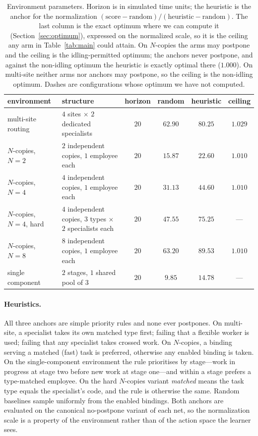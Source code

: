 \documentclass[review,authoryear,3p,times]{elsarticle}
\begin{document}
\begin{table}[tbp]
\centering
\caption{Environment parameters. Horizon is in simulated time units; the
heuristic is the anchor for the normalization
$(\text{score}-\text{random})/(\text{heuristic}-\text{random})$. The last
column is the exact optimum where we can compute it
(Section~\ref{sec:optimum}), expressed on the normalized scale, so it is the
ceiling any arm in Table~\ref{tab:main} could attain. On $N$-copies the arms
may postpone and the ceiling is the idling-permitted optimum; the anchors never
postpone, and against the non-idling optimum the heuristic is exactly optimal
there ($1.000$). On multi-site neither arms nor anchors may postpone, so the
ceiling is the non-idling optimum. Dashes are configurations whose optimum we
have not computed.}
\label{tab:envspec}
\small
\begin{tabular}{llcccc}
\toprule
environment & structure & horizon & random & heuristic & ceiling \\
\midrule
multi-site routing & $4$ sites $\times$ $2$ dedicated specialists & $20$ & $62.90$ & $80.25$ & $1.029$ \\
$N$-copies, $N=2$  & $2$ independent copies, $1$ employee each & $20$ & $15.87$ & $22.60$ & $1.010$ \\
$N$-copies, $N=4$  & $4$ independent copies, $1$ employee each & $20$ & $31.13$ & $44.60$ & $1.010$ \\
$N$-copies, $N=4$, hard & $4$ independent copies, $3$ types $\times$ $2$ specialists each & $20$ & $47.55$ & $75.25$ & --- \\
$N$-copies, $N=8$  & $8$ independent copies, $1$ employee each & $20$ & $63.20$ & $89.53$ & $1.010$ \\
single component   & $2$ stages, $1$ shared pool of $3$ & $20$ & $9.85$ & $14.78$ & --- \\
\bottomrule
\end{tabular}
\end{table}

\paragraph{Heuristics.} All three anchors are simple priority rules and none
ever postpones. On multi-site, a specialist takes its own matched type first;
failing that a flexible worker is used; failing that any specialist takes
crossed work. On $N$-copies, a binding serving a matched (fast) task is
preferred, otherwise any enabled binding is taken. On the single-component
environment the rule prioritises by stage---work in progress at stage two
before new work at stage one---and within a stage prefers a type-matched
employee. On the hard $N$-copies variant \emph{matched} means the task type
equals the specialist's code, and the rule is otherwise the same. Random baselines sample uniformly from the enabled bindings. Both
anchors are evaluated on the canonical no-postpone variant of each net, so the
normalization scale is a property of the environment rather than of the action
space the learner sees.
\end{document}
